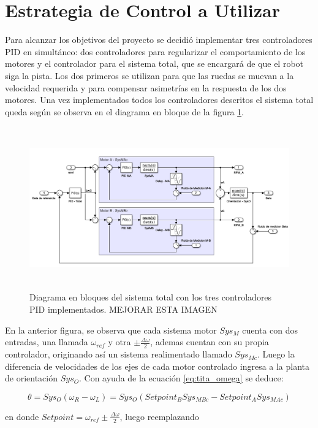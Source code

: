 \documentclass[10pt,conference,a4paper,onecolumn]{article}%
\begin{document}
\section{Estrategia de Control a Utilizar}
\label{sec:estrategia_de_control}
Para alcanzar los objetivos del proyecto se decidió implementar tres controladores PID en simultáneo: dos controladores para regularizar el comportamiento de los motores y el controlador para el sistema total, que se encargará de que el robot siga la pista. Los dos primeros se utilizan para que las ruedas se muevan a la velocidad requerida y para compensar asimetrías en la respuesta de los dos motores.
Una vez implementados todos los controladores descritos el sistema total queda según se observa en el diagrama en bloque de la figura \ref{diagra en bloques sist total}.
\begin{figure}[h]
\centering
\includegraphics[height=7cm]{./imagenes/sistema_total}
\caption{Diagrama en bloques del sistema total con los tres controladores PID implementados. MEJORAR ESTA IMAGEN}
\label{diagra en bloques sist total}
\end{figure}

En la anterior figura, se observa que cada sistema motor $Sys_M$ cuenta con dos entradas, una llamada $\omega_{ref}$ y otra $\pm \frac{\Delta \omega}{2}$, ademas cuentan con su propia controlador, originando así un sistema realimentado llamado $Sys_{Mc}$. Luego la diferencia de velocidades de los  ejes de cada motor controlado ingresa a la planta de orientación $Sys_O$. Con ayuda de la ecuación \ref{eq:tita_omega}  se deduce:

\begin{equation}
\theta=Sys_O(\omega_R - \omega_L)=Sys_O\left( Setpoint_BSys_{MBc} - Setpoint_ASys_{MAc}   \right)
\end{equation}

en donde $Setpoint = \omega_{ref} \pm \frac{\Delta \omega}{2}$, luego reemplazando
\end{document}
